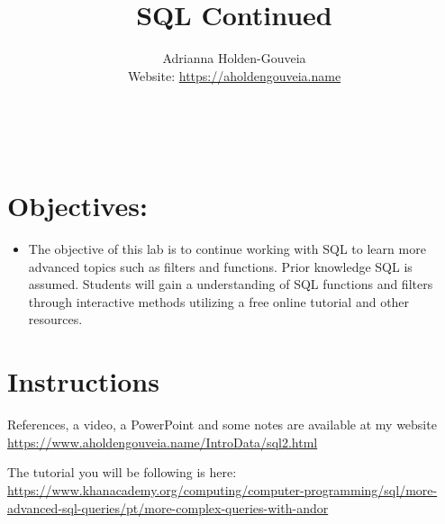 \documentclass[12pt]{article}
\title{SQL Continued}
\author{
        Adrianna Holden-Gouveia \\
        Website: \url{https://aholdengouveia.name}\\ 
        \date{\vspace{-5ex}}
        \faLinkedin{: aholdengouveia} \\
        \faGithub {: aholdengouveia} \\
        }
\begin{document}
    

\maketitle


\section*{Objectives:}
\begin{itemize}
    \item The objective of this lab is to continue working with SQL to learn more advanced topics such as filters and functions. Prior knowledge SQL is assumed. Students will gain a understanding of SQL functions and filters through interactive methods utilizing a free online tutorial and other resources.
\end{itemize}
\section*{Instructions}

References, a video, a PowerPoint and some notes are available at my website
\url {https://www.aholdengouveia.name/IntroData/sql2.html}

The tutorial you will be following is here: \url{https://www.khanacademy.org/computing/computer-programming/sql/more-advanced-sql-queries/pt/more-complex-queries-with-andor} 
\end{document}

